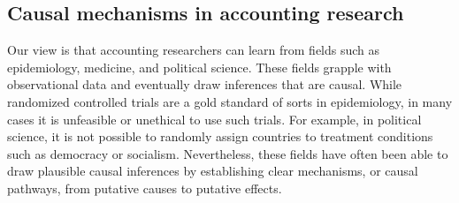\documentclass[12pt,reqno,titlepage]{amsart}
\begin{document}
\begin{doublespace}
\subsection{Causal mechanisms in accounting research}
Our view is that accounting researchers can learn from fields such as epidemiology, medicine, and political science. 
These fields grapple with observational data and eventually draw inferences that are causal. 
While randomized controlled trials are a gold standard of sorts in epidemiology, in many cases it is unfeasible or unethical to use such trials.
For example, in political science, it is not possible to randomly assign countries to treatment conditions such as democracy or socialism.
Nevertheless, these fields have often been able to draw plausible causal inferences by establishing clear mechanisms, or causal pathways, from putative causes to putative effects. 


\end{doublespace}
\end{document}
